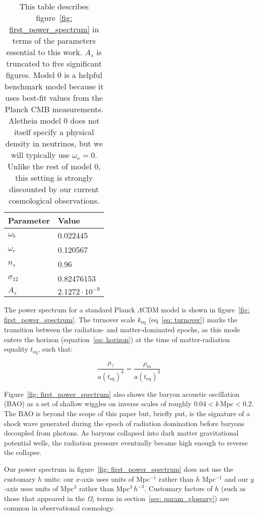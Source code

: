\begin{table}[htb]
\centering
\begin{tabular}{l|l}
\hline
Parameter & Value \\ \hline
$\omega_b$ & 0.022445 \\
$\omega_c$ & 0.120567 \\
$n_s$ & 0.96 \\
$\sigma_{12}$ & 0.82476153 \\
$A_s$ & $2.1272 \cdot 10^{-9}$ \\ \hline
\end{tabular}
 \caption[Aletheia Model 0 Parameters]{This table describes
 figure~\ref{fig: first_power_spectrum} in terms of the parameters
 essential to this work. $A_s$ is truncated to five significant figures.
 Model 0 is a helpful benchmark model because it uses
 best-fit values from the Planck CMB measurements. Aletheia model 0 does not
 itself specify a physical density in neutrinos, but we will typically use
 $\omega_\nu = 0$. Unlike the rest of model 0, this setting is strongly 
 	discounted by our current cosmological observations.}
 \label{tab: Aletheia_m0}
\end{table}

The power spectrum for a standard Planck $\Lambda$CDM model is shown in
figure~\ref{fig: first_power_spectrum}. The turnover scale $k_\text{eq}$
(eq~\ref{eq: turnover}) marks
the transition between the radiation- and matter-dominated epochs, as
this mode enters the horizon (equation~\ref{eq: horizon}) at the time of
matter-radiation equality $t_\text{eq}$, such that:

\begin{equation}
\frac{\rho_\gamma}{a(t_\text{eq})^4}
=
\frac{\rho_m}{a(t_\text{eq})^3}
\end{equation} 

Figure~\ref{fig: first_power_spectrum} also shows the baryon acoustic
oscillation (BAO) as a set of shallow wiggles on inverse scales of roughly
$0.04 < k \, \text{Mpc} < 0.2$. The BAO is beyond the scope of this paper but,
briefly put, is the signature of a shock wave generated during the epoch of
radiation domination before baryons decoupled from photons. As baryons
collapsed into dark matter gravitational potential wells, the radiation
pressure eventually became high enough to reverse the collapse.


Our power spectrum in
figure~\ref{fig: first_power_spectrum} does not use the customary $h$ units:
our $x$-axis uses units of Mpc$^{-1}$ rather than $h$ Mpc$^{-1}$ and our
$y$-axis uses units of Mpc$^3$ rather than Mpc$^3 \, h^{-3}$. 
Customary factors of $h$ (such as those that appeared in the $\Omega_i$
terms in section~\ref{sec: param_glossary}) are common in observational
cosmology.

